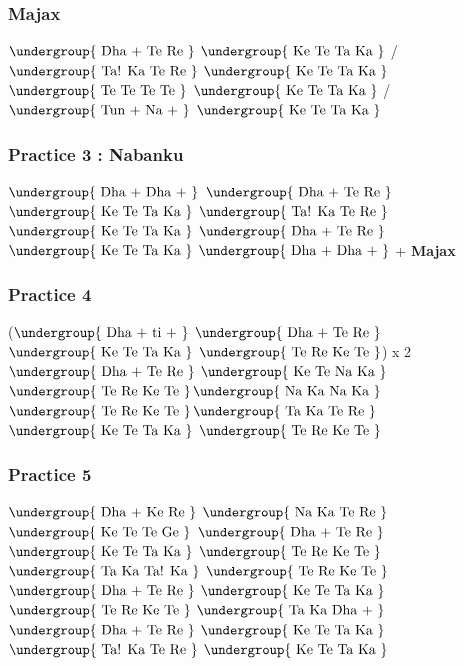 \documentclass[12pt]{article}
\def\kihai{kihai}
\newcommand{\matra}[1]{$\undergroup{\text{#1}}$}
\newif\ifdoigt
\newcommand{\bol}[2]{%
  \ifdoigt
  \pbox[b]{2cm}
       {\hspace*{\fill}{\scriptsize #2}\\#1}
  \else
      {#1}
  \fi
}%
\def\Go{\bol{Ge}{1}}
\def\Gd{\bol{Ge}{2}}
\def\K{\bol{Ke}{}}
\def\Ka{\bol{Ka}{}}
\def\To{\bol{Te}{gn1}}
\def\Ro{\bol{Re}{gn1}}
\def\Tt{\bol{Te}{g3}}
\def\Ta{\bol{Ta}{g3}}
\def\ti{\bol{ti}{gn2}}
\def\Rt{\bol{Re}{g3}}
\def\N{\bol{Na}{k}}
\def\Taa{\bol{Ta!}{g4}}
\def\Tu{\bol{Tun}{sn1}}
\def\Da{\bol{Dha}{k/2}}
\def\Ka{\bol{Ka}{}}
\def\sep{ / }
\def\sepnl{\\}
\newcommand{\double}[1]{%
  #1\bol{+}{}
  }%
\def\TRKT{\matra{\Tt \Ro \K \Tt}}
\begin{document}



\subsubsection*{Majax}
\matra{\double{\Da} \Tt \Ro} \matra{\K \Tt \Ta \Ka} \sep
\matra{\Taa \Ka \Tt \Ro}    \matra{\K \Tt \Ta \Ka} \sepnl
\matra{\Tt \To \Tt \To}  \matra{\K \Tt \Ta \Ka} \sep
\matra{\double{\Tu} \double{\N}} \matra{\K \Tt \Ta \Ka} 

\subsubsection*{Practice 3 : Nabanku}
\matra{\double{\Da}\double{\Da}} \matra{\double{\Da}\Tt \Ro}
\matra{\K \Tt \Ta \Ka} \matra{\Taa \Ka \Tt \Ro} \sepnl
\matra{\K \Tt \Ta \Ka} \matra{\double{\Da} \Tt \Ro}
\matra{\K \Tt \Ta \Ka} \matra{\double{\Da}\double{\Da}} + \textbf{Majax}

\subsubsection*{Practice 4}
(\matra{\double{\Da} \double{\ti}} \matra{\double{\Da} \Tt \Ro}
\matra{\K \Tt \Ta \Ka}  \TRKT ) x 2 \sepnl
\matra{\double{\Da} \Tt \Ro} \matra{\K \Tt \N \Ka}
\TRKT \matra{\N \Ka \N \Ka} \sepnl
\TRKT \matra{\Ta \Ka \Tt \Ro} \matra{\K \Tt \Ta \Ka} \TRKT 

\subsubsection*{Practice 5}
\matra{\double{\Da} \K \Rt} \matra{\N \Ka \Tt \Ro}
\matra{\K \Tt \To \Go} \matra{\double{\Da} \Tt \Ro} \sepnl
\matra{\K \Tt \Ta \Ka} \matra{\Tt \Ro \K \Tt}
\matra{\Ta \Ka \Taa \Ka} \TRKT \sepnl
\matra{\double{\Da} \Tt \Ro} \matra{\K \Tt \Ta \Ka}
\matra{\Tt \Ro \K \Tt} \matra{\Ta \Ka \double{\Da}} \sepnl
\matra{\double{\Da} \Tt \Ro} \matra{\K \Tt \Ta \Ka}
\matra{\Taa \Ka \Tt \Ro} \matra{\K \Tt \Ta \Ka}
\end{document}
